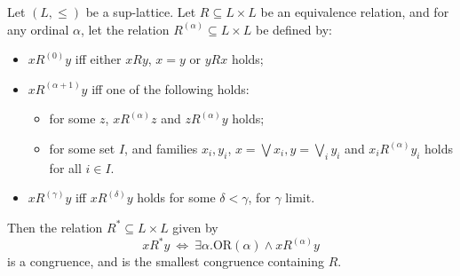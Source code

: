 \begin{proposition}\label{prop:smallestcongruence}
Let $(L,\leq)$ be a sup-lattice. Let $R\subseteq L\times L$ be an equivalence relation, and for any ordinal $\alpha$, let the relation
$R^{(\alpha)}\subseteq L\times L$ be defined by:
\begin{itemize}
\item $xR^{(0)}y$ iff either $xRy$, $x=y$ or $yRx$ holds;
\item $xR^{(\alpha+1)}y$ iff one of the following holds:
	\begin{itemize}
	\item for some $z$, $xR^{(\alpha)}z$ and $zR^{(\alpha)}y$ holds;
	\item for some set $I$, and families $x_{i},y_{i}$, 
	$x=\bigvee x_{i}, y=\bigvee_{i}y_{i}$ and $x_{i} R^{(\alpha)}y_{i}$ holds for all $i\in I$.

	\end{itemize}
\item $xR^{(\gamma)}y$ iff $xR^{(\delta)}y$ holds for some $\delta <\gamma$, for $\gamma$ limit.
\end{itemize}
Then the relation $R^{*}\subseteq L\times L$ given by 
$$
xR^{*} y  \ \Leftrightarrow \ \exists \alpha . \mathrm{OR}(\alpha) \land xR^{(\alpha)}y
$$%
is a congruence, and is the smallest congruence containing $R$.
\end{proposition}
